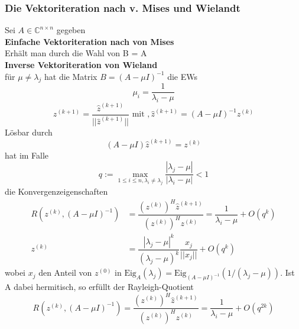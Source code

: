 \documentclass[
	ngerman,
	accentcolor=9c,%
	type=intern,
	marginpar=false
	]{tudapub}
\begin{document}
            \subsubsection{Die Vektoriteration nach v. Mises und Wielandt}
                Sei $A\in \mathbb{C}^{n\times n}$ gegeben \\
                \textbf{Einfache Vektoriteration nach von Mises} \\
                Erhält man durch die Wahl von B = A\\
                \textbf{Inverse Vektoriteration von Wieland}\\
                für $\mu \not = \lambda_j$ hat die Matrix $B=(A-\mu I)^{-1}$ die EWs
                \begin{equation*}
                    \mu_i = \dfrac{1}{\lambda_i - \mu}
                \end{equation*}
                \begin{equation*}
                    z^{(k+1)} = \dfrac{\hat{z}^{(k+1)}}{||\hat{z}^{(k+1)}||} \mbox{ mit },
                    \hat{z}^{(k+1)}=(A-\mu I)^{-1}z^{(k)}
                \end{equation*}                
                Lösbar durch 
                \begin{equation*}
                    (A-\mu I)\hat{z}^{(k+1)} = z^{(k)}
                \end{equation*}
                hat im Falle
                \begin{equation*}
                    q := \max_{1 \leq i \leq n, \lambda_i \not = \lambda_j} \dfrac{|\lambda_j- \mu|}{|\lambda_i- \mu|}<1
                \end{equation*}
                die Konvergenzeigenschaften
                \begin{align*}
                    R(z^{(k)}, (A - \mu I)^{-1}) &= \dfrac{(z^{(k)})^H\hat{z}^{(k+1)}}{(z^{(k)})^Hz^{(k)}} = \dfrac{1}{\lambda_i - \mu} + O(q^k)\\
                    z^{(k)} &= \dfrac{|\lambda_j-\mu|^k}{(\lambda_j-\mu)^k}\dfrac{x_j}{||x_j||}+O(q^k)
                \end{align*}
                wobei $x_j$ den Anteil von $z^{(0)}$ in $\text{Eig}_A(\lambda_j) = \text{Eig}_{(A-\mu I)^{-1}}(1/(\lambda_j - \mu))$.
                Ist A dabei hermitisch, so erfüllt der Rayleigh-Quotient
                \begin{equation*}
                    R(z^{(k)}, (A - \mu I)^{-1}) = \dfrac{(z^{(k)})^H\hat{z}^{(k+1)}}{(z^{(k)})^Hz^{(k)}} = \dfrac{1}{\lambda_i - \mu} + O(q^{2k})
                \end{equation*}
\end{document}

